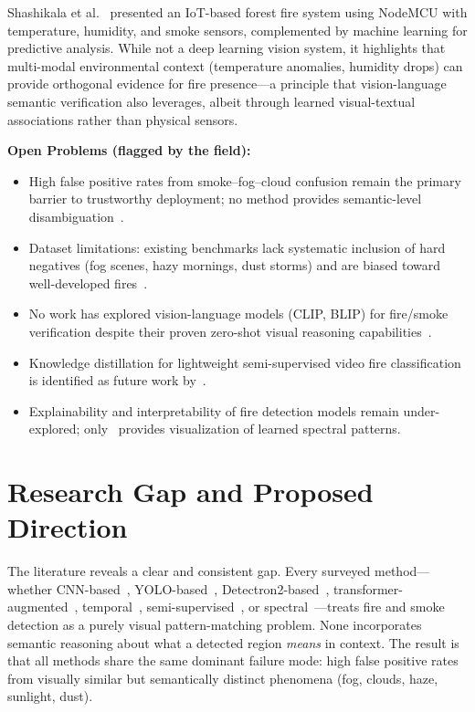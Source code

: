 \documentclass[11pt,twocolumn]{article}
\begin{document}
Shashikala et al.~\cite{iot_nodefire} presented an IoT-based forest fire system using NodeMCU with temperature, humidity, and smoke sensors, complemented by machine learning for predictive analysis. While not a deep learning vision system, it highlights that multi-modal environmental context (temperature anomalies, humidity drops) can provide orthogonal evidence for fire presence---a principle that vision-language semantic verification also leverages, albeit through learned visual-textual associations rather than physical sensors.

\textbf{Open Problems (flagged by the field):}
\begin{itemize}[leftmargin=*, itemsep=2pt]
    \item High false positive rates from smoke--fog--cloud confusion remain the primary barrier to trustworthy deployment; no method provides semantic-level disambiguation~\cite{spectral_smoke, cnn_vit_smoke, detectron2fire}.
    \item Dataset limitations: existing benchmarks lack systematic inclusion of hard negatives (fog scenes, hazy mornings, dust storms) and are biased toward well-developed fires~\cite{firematch, cnn_fire_detection}.
    \item No work has explored vision-language models (CLIP, BLIP) for fire/smoke verification despite their proven zero-shot visual reasoning capabilities~\cite{clip}.
    \item Knowledge distillation for lightweight semi-supervised video fire classification is identified as future work by~\cite{firematch}.
    \item Explainability and interpretability of fire detection models remain under-explored; only~\cite{spectral_smoke} provides visualization of learned spectral patterns.
\end{itemize}

\section{Research Gap and Proposed Direction}
\label{sec:gap}

The literature reveals a clear and consistent gap. Every surveyed method---whether CNN-based~\cite{cnn_fire_detection}, YOLO-based~\cite{yolov8_smartcity}, Detectron2-based~\cite{detectron2fire}, transformer-augmented~\cite{cnn_vit_smoke}, temporal~\cite{bilstm_smoke}, semi-supervised~\cite{firematch}, or spectral~\cite{spectral_smoke}---treats fire and smoke detection as a purely visual pattern-matching problem. None incorporates semantic reasoning about what a detected region \emph{means} in context. The result is that all methods share the same dominant failure mode: high false positive rates from visually similar but semantically distinct phenomena (fog, clouds, haze, sunlight, dust).
\end{document}
